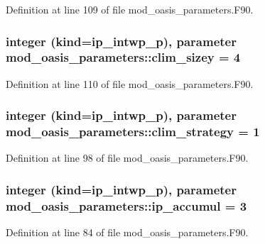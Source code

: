Definition at line 109 of file mod\+\_\+oasis\+\_\+parameters.\+F90.

\hypertarget{classmod__oasis__parameters_a206910560c246db3404224a04cfd4319}{
\subsubsection[{clim\+\_\+sizey}]{\setlength{\rightskip}{0pt plus 5cm}integer (kind=ip\+\_\+intwp\+\_\+p), parameter mod\+\_\+oasis\+\_\+parameters\+::clim\+\_\+sizey = 4}}\label{classmod__oasis__parameters_a206910560c246db3404224a04cfd4319}


Definition at line 110 of file mod\+\_\+oasis\+\_\+parameters.\+F90.

\hypertarget{classmod__oasis__parameters_a611cae6f3c65a75f26e76b2f88f34037}{
\subsubsection[{clim\+\_\+strategy}]{\setlength{\rightskip}{0pt plus 5cm}integer (kind=ip\+\_\+intwp\+\_\+p), parameter mod\+\_\+oasis\+\_\+parameters\+::clim\+\_\+strategy = 1}}\label{classmod__oasis__parameters_a611cae6f3c65a75f26e76b2f88f34037}


Definition at line 98 of file mod\+\_\+oasis\+\_\+parameters.\+F90.

\hypertarget{classmod__oasis__parameters_adfaf98517b8396e4ba667f2f8bcd0ed5}{
\subsubsection[{ip\+\_\+accumul}]{\setlength{\rightskip}{0pt plus 5cm}integer (kind=ip\+\_\+intwp\+\_\+p), parameter mod\+\_\+oasis\+\_\+parameters\+::ip\+\_\+accumul = 3}}\label{classmod__oasis__parameters_adfaf98517b8396e4ba667f2f8bcd0ed5}


Definition at line 84 of file mod\+\_\+oasis\+\_\+parameters.\+F90.


